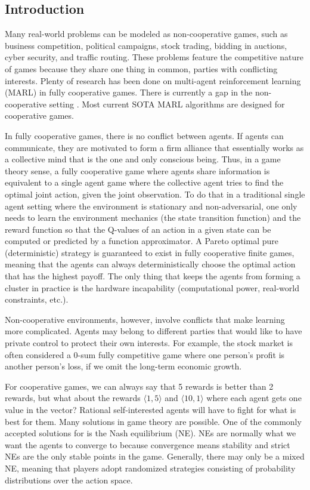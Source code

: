 \documentclass[a4paper]{article}
\begin{document}
\begin{multicols}{2}
\setlength{\columnsep}{0.5cm}

\section{Introduction}
Many real-world problems can be modeled as non-cooperative games, such as business competition, political campaigns, stock trading, bidding in auctions, cyber security, and traffic routing. These problems feature the competitive nature of games because they share one thing in common, parties with conflicting interests. Plenty of research has been done on multi-agent reinforcement learning (MARL) in fully cooperative games. There is currently a gap in the non-cooperative setting \cite{zhu2024survey}. Most current SOTA MARL algorithms are designed for cooperative games.

In fully cooperative games, there is no conflict between agents. If agents can communicate, they are motivated to form a firm alliance that essentially works as a collective mind that is the one and only conscious being. Thus, in a game theory sense, a fully cooperative game where agents share information is equivalent to a single agent game where the collective agent tries to find the optimal joint action, given the joint observation. To do that in a traditional single agent setting where the environment is stationary and non-adversarial, one only needs to learn the environment mechanics (the state transition function) and the reward function so that the Q-values of an action in a given state can be computed or predicted by a function approximator. A Pareto optimal pure (deterministic) strategy is guaranteed to exist in fully cooperative finite games, meaning that the agents can always deterministically choose the optimal action that has the highest payoff. The only thing that keeps the agents from forming a cluster in practice is the hardware incapability (computational power, real-world constraints, etc.).

Non-cooperative environments, however, involve conflicts that make learning more complicated. Agents may belong to different parties that would like to have private control to protect their own interests. For example, the stock market is often considered a 0-sum fully competitive game where one person's profit is another person's loss, if we omit the long-term economic growth.

For cooperative games, we can always say that 5 rewards is better than 2 rewards, but what about the rewards $\langle 1,5 \rangle$ and  $\langle 10,1 \rangle$ where each agent gets one value in the vector? Rational self-interested agents will have to fight for what is best for them. Many solutions in game theory are possible. One of the commonly accepted solutions for is the Nash equilibrium (NE). NEs are normally what we want the agents to converge to because convergence means stability and strict NEs are the only stable points in the game. Generally, there may only be a mixed NE, meaning that players adopt randomized strategies consisting of probability distributions over the action space.


\end{multicols}
\end{document}
